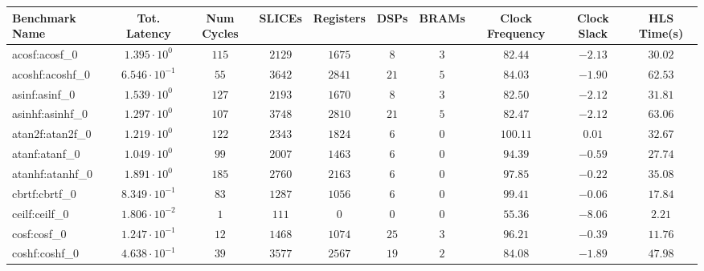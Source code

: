 \begin{tabular}{|l|c|c|c|c|c|c|c|c|c|}
\hline
Benchmark Name               & Tot. Latency            & Num Cycles & SLICEs    & Registers & DSPs    & BRAMs  & Clock Frequency & Clock Slack & HLS Time(s) \\
\hline
acosf:acosf\_0               & $ 1.395 \cdot 10^{0}  $ & $ 115    $ & $ 2129  $ & $ 1675  $ & $ 8   $ & $ 3  $ & $ 82.44       $ & $ -2.13   $ & $ 30.02   $ \\
acoshf:acoshf\_0             & $ 6.546 \cdot 10^{-1} $ & $ 55     $ & $ 3642  $ & $ 2841  $ & $ 21  $ & $ 5  $ & $ 84.03       $ & $ -1.90   $ & $ 62.53   $ \\
asinf:asinf\_0               & $ 1.539 \cdot 10^{0}  $ & $ 127    $ & $ 2193  $ & $ 1670  $ & $ 8   $ & $ 3  $ & $ 82.50       $ & $ -2.12   $ & $ 31.81   $ \\
asinhf:asinhf\_0             & $ 1.297 \cdot 10^{0}  $ & $ 107    $ & $ 3748  $ & $ 2810  $ & $ 21  $ & $ 5  $ & $ 82.47       $ & $ -2.12   $ & $ 63.06   $ \\
atan2f:atan2f\_0             & $ 1.219 \cdot 10^{0}  $ & $ 122    $ & $ 2343  $ & $ 1824  $ & $ 6   $ & $ 0  $ & $ 100.11      $ & $ 0.01    $ & $ 32.67   $ \\
atanf:atanf\_0               & $ 1.049 \cdot 10^{0}  $ & $ 99     $ & $ 2007  $ & $ 1463  $ & $ 6   $ & $ 0  $ & $ 94.39       $ & $ -0.59   $ & $ 27.74   $ \\
atanhf:atanhf\_0             & $ 1.891 \cdot 10^{0}  $ & $ 185    $ & $ 2760  $ & $ 2163  $ & $ 6   $ & $ 0  $ & $ 97.85       $ & $ -0.22   $ & $ 35.08   $ \\
cbrtf:cbrtf\_0               & $ 8.349 \cdot 10^{-1} $ & $ 83     $ & $ 1287  $ & $ 1056  $ & $ 6   $ & $ 0  $ & $ 99.41       $ & $ -0.06   $ & $ 17.84   $ \\
ceilf:ceilf\_0               & $ 1.806 \cdot 10^{-2} $ & $ 1      $ & $ 111   $ & $ 0     $ & $ 0   $ & $ 0  $ & $ 55.36       $ & $ -8.06   $ & $ 2.21    $ \\
cosf:cosf\_0                 & $ 1.247 \cdot 10^{-1} $ & $ 12     $ & $ 1468  $ & $ 1074  $ & $ 25  $ & $ 3  $ & $ 96.21       $ & $ -0.39   $ & $ 11.76   $ \\
coshf:coshf\_0               & $ 4.638 \cdot 10^{-1} $ & $ 39     $ & $ 3577  $ & $ 2567  $ & $ 19  $ & $ 2  $ & $ 84.08       $ & $ -1.89   $ & $ 47.98   $ \\

\end{tabular}
